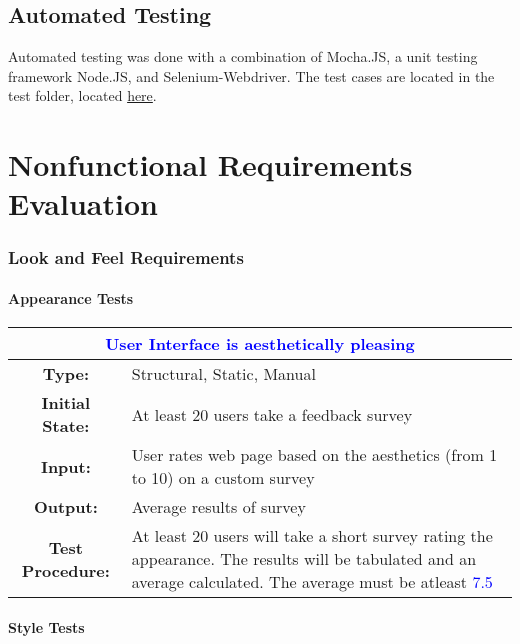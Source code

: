 \documentclass[12pt, titlepage]{article}
\newcommand{\acceptableRating}{\textcolor{blue}{7.5 }}
\begin{document}
\subsection{Automated Testing}

Automated testing was done with a combination of Mocha.JS, a unit testing framework Node.JS, and Selenium-Webdriver. The test cases are located in the test folder, located \href{https://gitlab.cas.mcmaster.ca/velechva/DJS/tree/master/src/test}{here}. 



\section{Nonfunctional Requirements Evaluation}
\subsubsection{Look and Feel Requirements}

\paragraph{Appearance Tests}

\begin{center}
\begin{table}[H]
\begin{tabularx}{\textwidth}{| c X |}
\hline
\multicolumn{2}{|c|}{\textbf{\textcolor{blue}{User Interface is aesthetically pleasing}}}\\
\hline
\textbf{Type: } & Structural, Static, Manual\\
\textbf{Initial State: } & At least 20 users take a feedback survey\\
\textbf{Input: } & User rates web page based on the aesthetics (from 1 to 10) on a custom survey\\
\textbf{Output: } & Average results of survey \\
\textbf{Test Procedure:  } & At least 20 users will take a short survey rating the appearance. The results will be tabulated and an average calculated. The average must be atleast \acceptableRating \\
\hline
\end{tabularx}
\end{table}
\end{center}

\paragraph{Style Tests}
\end{document}
